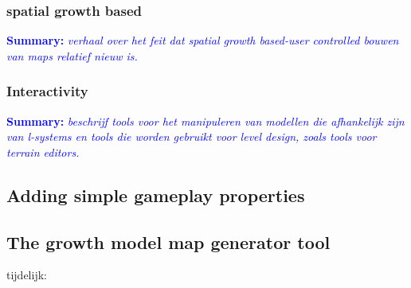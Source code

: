 \documentclass{article}
\newcommand{\inhoud}[1]{\textcolor{blue}{\textbf{Summary: }\it{#1}}}
\begin{document}
\subsubsection{spatial growth based}
\inhoud{verhaal over het feit dat spatial growth based-user controlled bouwen van maps relatief nieuw is.}

\subsubsection{Interactivity}
\inhoud{beschrijf tools voor het manipuleren van modellen die afhankelijk zijn van l-systems en tools die worden 
	gebruikt voor level design, zoals tools voor terrain editors.}


\subsection{Adding simple gameplay properties}

\subsection{The growth model map generator tool}


tijdelijk: 
\end{document}
